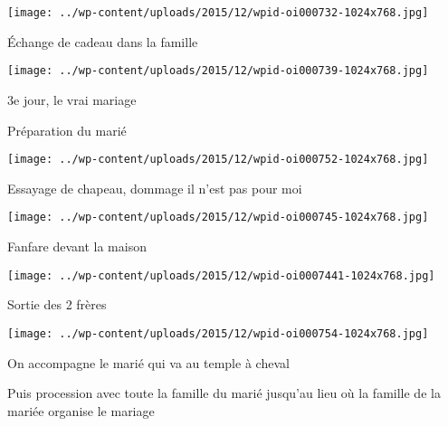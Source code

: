 \begin{center} \texttt{[image: ../wp-content/uploads/2015/12/wpid-oi000732-1024x768.jpg]} \end{center}

 

 Échange de cadeau dans la famille 

 

\begin{center} \texttt{[image: ../wp-content/uploads/2015/12/wpid-oi000739-1024x768.jpg]} \end{center}

 

 3e jour, le vrai mariage

 Préparation du marié 

 

\begin{center} \texttt{[image: ../wp-content/uploads/2015/12/wpid-oi000752-1024x768.jpg]} \end{center}

 

 Essayage de chapeau, dommage il n'est pas pour moi 

 

\begin{center} \texttt{[image: ../wp-content/uploads/2015/12/wpid-oi000745-1024x768.jpg]} \end{center}

 

 Fanfare devant la maison 

 

\begin{center} \texttt{[image: ../wp-content/uploads/2015/12/wpid-oi0007441-1024x768.jpg]} \end{center}

 

 Sortie des 2 frères 

 

\begin{center} \texttt{[image: ../wp-content/uploads/2015/12/wpid-oi000754-1024x768.jpg]} \end{center}

 

 On accompagne le marié qui va au temple à cheval

 Puis procession avec toute la famille du marié jusqu'au lieu où la famille de la mariée organise le mariage 

 

